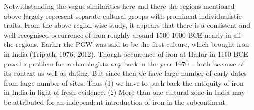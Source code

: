 Notwithstanding the vague similarities here and there the regions mentioned above largely represent separate cultural groups with prominent individualistic traits. From the above region-wise study, it appears that there is a consistent and well recognised occurrence of iron roughly around 1500-1000 BCE nearly in all the regions. Earlier the PGW was said to be the first culture, which brought iron in India (Tripathi 1976; 2012). Though occurrence of iron at Hallur in 1100 BCE posed a problem for archaeologists way back in the year 1970 – both because of its context as well as dating. But since then we have large number of early dates from large number of sites. Thus (1) we have to push back the antiquity of iron in India in light of fresh evidence. (2) More than one cultural zone in India may be attributed for an independent introduction of iron in the subcontinent.
